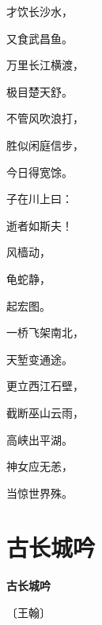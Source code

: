 \documentclass[12pt,UTF-8,openany,fontset=none]{ctexbook}
\begin{document}
\begin{center}
    \begin{Large}

        才饮长沙水，

        又食武昌鱼。

        万里长江横渡，

        极目楚天舒。

        不管风吹浪打，

        胜似闲庭信步，

        今日得宽馀。

        子在川上曰：

        逝者如斯夫！

        \vspace{18pt}  %

        风樯动，

        龟蛇静，

        起宏图。

        一桥飞架南北，

        天堑变通途。

        更立西江石壁，

        截断巫山云雨，

        高峡出平湖。

        神女应无恙，

        当惊世界殊。

    \end{Large}

\end{center}

\vspace{8pt}
\clearpage

\section{古长城吟}


\begin{center}
    {\bfseries 古长城吟}

    \vspace{18pt}

    \begin{large}\xuwen
        〔王翰〕
    \end{large}

\end{center}

    \vspace{18pt}  %
\end{document}
